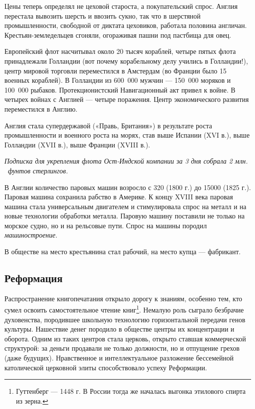 Цены теперь определял не цеховой староста, а покупательский спрос. Англия перестала вывозить шерсть и ввозить сукно, так
что в шерстяной промышленности, свободной от диктата цеховиков, работала половина англичан. Крестьян-земледельцев
сгоняли, огораживая пашни под пастбища для овец.


Европейский флот насчитывал около 20 тысяч кораблей, четыре пятых флота принадлежали Голландии (вот почему корабельному
делу учились в Голландии!), центр мировой торговли переместился в Амстердам (во Франции было 15 военных кораблей). В
Голландии из 600~000 мужчин — 150~000 моряков и 100~000 рыбаков. Протекционистский Навигационный акт привел к войне. В
четырех войнах с Англией — четыре поражения. Центр экономического развития переместился в Англию.


Англия стала супердержавой («Правь, Британия») в результате роста промышленности и военного роста на морях, став выше
Испании (\foreignlanguage{english}{XVI} в.), выше Голландии (\foreignlanguage{english}{XVII} в.), выше Франции
(\foreignlanguage{english}{XVIII} в.).

{\itshape
\foreignlanguage{russian}{Подписка для укрепления флота Ост-Индской компании за 3 дня собрала 2 млн. \ фунтов
стерлингов.}}


В Англии количество паровых машин возросло с 320 (1800 г.) до 15000 (1825 г.). Паровая машина сохранила рабство в
Америке. К концу \foreignlanguage{english}{XVIII} века паровая машина стала универсальным двигателем и стимулировала
спрос на металл и на новые технологии обработки металла. Паровую машину поставили не только на морское судно, но и на
рельсовые пути. Спрос на машины породил \textit{машиностроение}.


В обществе на место крестьянина стал рабочий, на место купца — фабрикант.

\subsection[Реформация ]{Реформация }

Распространение книгопечатания открыло дорогу к знаниям, особенно тем, кто сумел освоить самостоятельное чтение
книг\footnote{Гуттенберг — 1448 г. В России тогда же началась выгонка этилового спирта из зерна.}.
Немалую роль сыграло безбрачие духовенства, породившее школьную технологию горизонтальной передачи генов культуры.
Нашествие денег породило в обществе центры их концентрации и оборота. Одним из таких центров стала церковь, открыто
ставшая коммерческой структурой: за деньги продавали не только должности, но и отпущение грехов (даже будущих).
Нравственное и интеллектуальное разложение бессемейной католической церковной элиты способствовало успеху Реформации.


